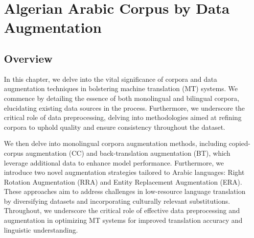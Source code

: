\chapter{Algerian Arabic Corpus by Data Augmentation}
\pagestyle{fancy}
\pagestyle{fancy}\chead{} \pagestyle{fancy}\rhead{}
\pagestyle{fancy} 
\pagestyle{fancy}\cfoot{} \pagestyle{fancy}\rfoot{\thepage}
\section{Overview}\label{start5}
In this chapter, we delve into the vital significance of corpora and data augmentation techniques in bolstering machine translation (MT) systems. 
We commence by detailing the essence of both monolingual and bilingual corpora, elucidating existing data sources in the process. 
Furthermore, we underscore the critical role of data preprocessing, delving into methodologies aimed at refining corpora to uphold quality and ensure consistency throughout the dataset.

We then delve into monolingual corpora augmentation methods, including copied-corpus augmentation (CC) and back-translation augmentation (BT), which leverage additional data to enhance model performance. 
Furthermore, we introduce two novel augmentation strategies tailored to Arabic languages: Right Rotation Augmentation (RRA) and Entity Replacement Augmentation (ERA). 
These approaches aim to address challenges in low-resource language translation by diversifying datasets and incorporating culturally relevant substitutions. 
Throughout, we underscore the critical role of effective data preprocessing and augmentation in optimizing MT systems for improved translation accuracy and linguistic understanding.

